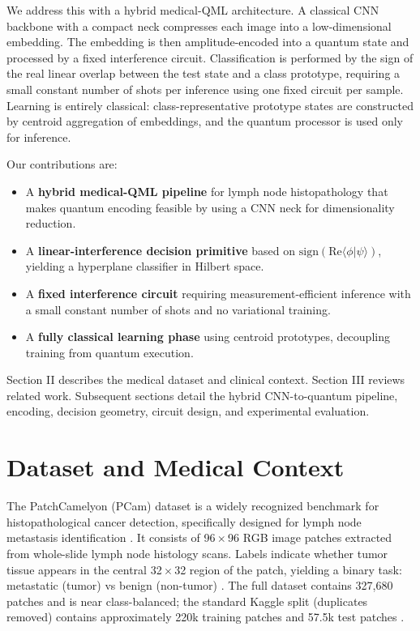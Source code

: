 \documentclass[conference]{IEEEtran}
\begin{document}
We address this with a hybrid medical-QML architecture. A classical CNN backbone with a compact neck compresses each image into a low-dimensional embedding. The embedding is then amplitude-encoded into a quantum state and processed by a fixed interference circuit. Classification is performed by the sign of the real linear overlap between the test state and a class prototype, requiring a small constant number of shots per inference using one fixed circuit per sample. Learning is entirely classical: class-representative prototype states are constructed by centroid aggregation of embeddings, and the quantum processor is used only for inference.

Our contributions are:
\begin{itemize}
    \item A \textbf{hybrid medical-QML pipeline} for lymph node histopathology that makes quantum encoding feasible by using a CNN neck for dimensionality reduction.
    \item A \textbf{linear-interference decision primitive} based on $\mathrm{sign}(\mathrm{Re}\langle\phi|\psi\rangle)$, yielding a hyperplane classifier in Hilbert space.
    \item A \textbf{fixed interference circuit} requiring measurement-efficient inference with a small constant number of shots and no variational training.
    \item A \textbf{fully classical learning phase} using centroid prototypes, decoupling training from quantum execution.
\end{itemize}

Section II describes the medical dataset and clinical context. Section III reviews related work. Subsequent sections detail the hybrid CNN-to-quantum pipeline, encoding, decision geometry, circuit design, and experimental evaluation.

\section{Dataset and Medical Context}

The PatchCamelyon (PCam) dataset is a widely recognized benchmark for histopathological cancer detection, specifically designed for lymph node metastasis identification \cite{pcam_veeling2018,pcam_01,pcam_03}. It consists of 96\,$\times$\,96 RGB image patches extracted from whole-slide lymph node histology scans. Labels indicate whether tumor tissue appears in the central 32\,$\times$\,32 region of the patch, yielding a binary task: metastatic (tumor) vs benign (non-tumor) \cite{pcam_veeling2018}. The full dataset contains 327{,}680 patches and is near class-balanced; the standard Kaggle split (duplicates removed) contains approximately 220k training patches and 57.5k test patches \cite{pcam_veeling2018,pcam_03}.
\end{document}
